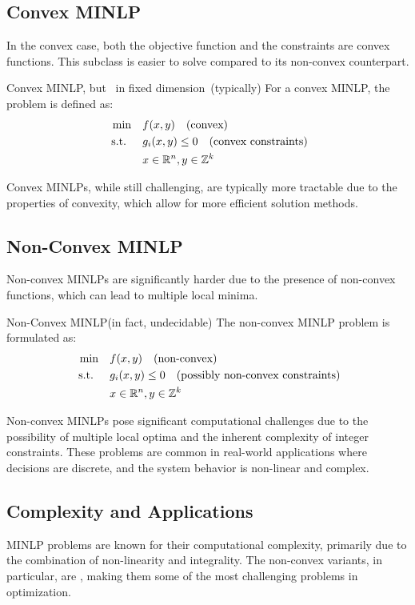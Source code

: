 \subsection{Convex MINLP}
In the convex case, both the objective function and the constraints are convex functions. This subclass is easier to solve compared to its non-convex counterpart.
\begin{general}{Convex MINLP}{\nphard, but \polynomial\ in fixed dimension\  (typically)}
For a convex MINLP, the problem is defined as:
\begin{equation}
\label{eq:convex-minlp}
\begin{split}
\min \quad & f(x, y) \quad \text{(convex)}\\
\text{ s.t. }  \quad & g_i(x, y) \leq 0  \quad  \text{(convex constraints)}\\
           & x \in \mathbb{R}^n, y \in \mathbb{Z}^k
\end{split}
\end{equation}
\end{general}
Convex MINLPs, while still challenging, are typically more tractable due to the properties of convexity, which allow for more efficient solution methods.

\subsection{Non-Convex MINLP}
Non-convex MINLPs are significantly harder due to the presence of non-convex functions, which can lead to multiple local minima.
\begin{general}{Non-Convex MINLP}{\nphard (in fact, undecidable)}
The non-convex MINLP problem is formulated as:
\begin{equation}
\label{eq:nonconvex-minlp}
\begin{split}
\min \quad & f(x, y) \quad
\text{(non-convex)}\\
\text{ s.t. } \quad & g_i(x, y) \leq 0 \quad \text{(possibly non-convex constraints)}\\
& x \in \mathbb{R}^n, y \in \mathbb{Z}^k
\end{split}
\end{equation}
\end{general}
Non-convex MINLPs pose significant computational challenges due to the possibility of multiple local optima and the inherent complexity of integer constraints. These problems are common in real-world applications where decisions are discrete, and the system behavior is non-linear and complex.

\subsection*{Complexity and Applications}
MINLP problems are known for their computational complexity, primarily due to the combination of non-linearity and integrality. The non-convex variants, in particular, are \nphard, making them some of the most challenging problems in optimization.


